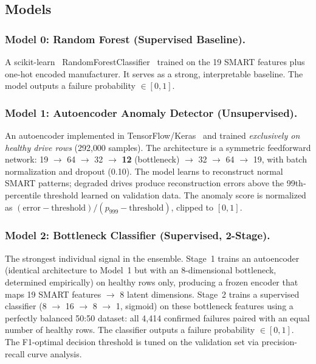 \documentclass[sigconf,natbib=false, language=english]{acmart}
\begin{document}
\subsection{Models}
\label{sec:models}

\subsubsection{Model 0: Random Forest (Supervised Baseline).}
A scikit-learn~\cite{pedregosa2011scikit} RandomForestClassifier~\cite{breiman2001random} trained on the 19 SMART features plus one-hot encoded manufacturer. It serves as a strong, interpretable baseline. The model outputs a failure probability $\in [0, 1]$.

\subsubsection{Model 1: Autoencoder Anomaly Detector (Unsupervised).}
An autoencoder implemented in TensorFlow/Keras~\cite{tensorflow2015} and trained \emph{exclusively on healthy drive rows} (292{,}000 samples). The architecture is a symmetric feedforward network: 19 $\to$ 64 $\to$ 32 $\to$ \textbf{12} (bottleneck) $\to$ 32 $\to$ 64 $\to$ 19, with batch normalization and dropout (0.10). The model learns to reconstruct normal SMART patterns; degraded drives produce reconstruction errors above the 99th-percentile threshold learned on validation data. The anomaly score is normalized as $(\text{error} - \text{threshold}) / (p_{999} - \text{threshold})$, clipped to $[0, 1]$.

\subsubsection{Model 2: Bottleneck Classifier (Supervised, 2-Stage).}
The strongest individual signal in the ensemble. Stage~1 trains an autoencoder (identical architecture to Model~1 but with an 8-dimensional bottleneck, determined empirically) on healthy rows only, producing a frozen encoder that maps 19 SMART features $\to$ 8 latent dimensions. Stage~2 trains a supervised classifier (8 $\to$ 16 $\to$ 8 $\to$ 1, sigmoid) on these bottleneck features using a perfectly balanced 50:50 dataset: all 4{,}414 confirmed failures paired with an equal number of healthy rows. The classifier outputs a failure probability $\in [0, 1]$. The F1-optimal decision threshold is tuned on the validation set via precision-recall curve analysis.
\end{document}
